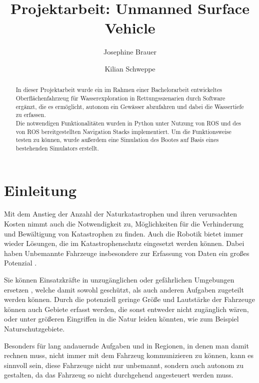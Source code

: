\documentclass[11pt]{article}
\begin{document}
\title{Projektarbeit: Unmanned Surface Vehicle}

\author{Josephine Brauer \and Kilian Schweppe}

\maketitle

\begin{abstract}
In dieser Projektarbeit wurde ein im Rahmen einer Bachelorarbeit entwickeltes Oberflächenfahrzeug für Wasserexploration in Rettungsszenarien durch Software ergänzt, die es ermöglicht, autonom ein Gewässer abzufahren und dabei die Wassertiefe zu erfassen.\\
Die notwendigen Funktionalitäten wurden in Python unter Nutzung von ROS und des von ROS bereitgestellten Navigation Stacks implementiert. Um die Funktionsweise testen zu können, wurde außerdem eine Simulation des Bootes auf Basis eines bestehenden Simulators erstellt.\\
\end{abstract}

\section{Einleitung}
Mit dem Anstieg der Anzahl der Naturkatastrophen und ihren verursachten Kosten\cite{kellenberg} nimmt auch die Notwendigkeit zu, Möglichkeiten für die Verhinderung und Bewältigung von Katastrophen zu finden. Auch die Robotik bietet immer wieder Lösungen, die im Katastrophenschutz eingesetzt werden können. Dabei haben Unbemannte Fahrzeuge insbesondere zur Erfassung von Daten ein großes Potenzial \cite{surveyDisasterRobotics}.

Sie können Einsatzkräfte in unzugänglichen oder gefährlichen Umgebungen ersetzen \cite{bellingham}, welche damit sowohl geschützt, als auch anderen Aufgaben zugeteilt werden können. Durch die potenziell geringe Größe und Lautstärke der Fahrzeuge können auch Gebiete erfasst werden, die sonst entweder nicht zugänglich wären, oder unter größeren Eingriffen in die Natur leiden könnten, wie zum Beispiel Naturschutzgebiete.

Besonders für lang andauernde Aufgaben und in Regionen, in denen man damit rechnen muss, nicht immer mit dem Fahrzeug kommunizieren zu können, kann es sinnvoll sein, diese Fahrzeuge nicht nur unbemannt, sondern auch autonom zu gestalten, da das Fahrzeug so nicht durchgehend angesteuert werden muss.
\end{document}
